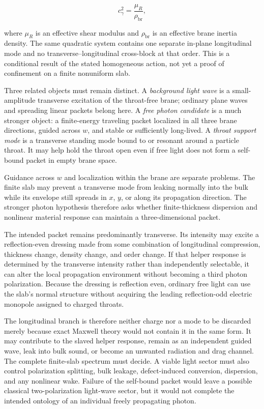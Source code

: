 \[
c_\gamma^2=\frac{\mu_R}{\rho_{\mathrm{br}}},
\]

where \(\mu_R\) is an effective shear modulus and \(\rho_{\mathrm{br}}\) is an
effective brane inertia density. The same quadratic system contains one separate
in-plane longitudinal mode and no transverse--longitudinal cross-block at that
order. This is a conditional result of the stated homogeneous action, not yet a
proof of confinement on a finite nonuniform slab.

Three related objects must remain distinct. A \emph{background light wave} is a
small-amplitude transverse excitation of the throat-free brane; ordinary plane
waves and spreading linear packets belong here. A \emph{free photon candidate}
is a much stronger object: a finite-energy traveling packet localized in all
three brane directions, guided across \(w\), and stable or sufficiently
long-lived. A \emph{throat support mode} is a transverse standing mode bound to
or resonant around a particle throat. It may help hold the throat open even if
free light does not form a self-bound packet in empty brane space.

Guidance across \(w\) and localization within the brane are separate problems.
The finite slab may prevent a transverse mode from leaking normally into the
bulk while its envelope still spreads in \(x\), \(y\), or along its propagation
direction. The stronger photon hypothesis therefore asks whether finite-thickness
dispersion and nonlinear material response can maintain a three-dimensional
packet.

The intended packet remains predominantly transverse. Its intensity may excite
a reflection-even dressing made from some combination of longitudinal
compression, thickness change, density change, and order change. If that helper
response is determined by the transverse intensity rather than independently
selectable, it can alter the local propagation environment without becoming a
third photon polarization. Because the dressing is reflection even, ordinary
free light can use the slab's normal structure without acquiring the leading
reflection-odd electric monopole assigned to charged throats.

The longitudinal branch is therefore neither charge nor a mode to be discarded
merely because exact Maxwell theory would not contain it in the same form. It
may contribute to the slaved helper response, remain as an independent guided
wave, leak into bulk sound, or become an unwanted radiation and drag channel.
The complete finite-slab spectrum must decide. A viable light sector must also
control polarization splitting, bulk leakage, defect-induced conversion,
dispersion, and any nonlinear wake. Failure of the self-bound packet would
leave a possible classical two-polarization light-wave sector, but it would not
complete the intended ontology of an individual freely propagating photon.

